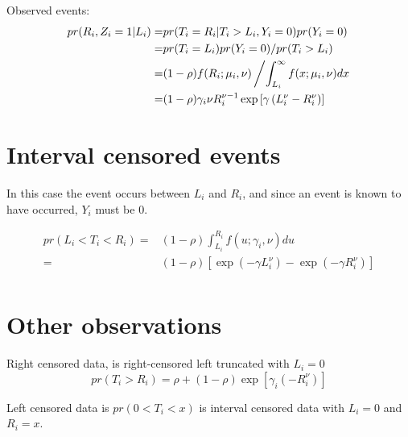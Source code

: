 \documentclass{article}
\begin{document}
Observed events:
\begin{align*}
pr(R_i, Z_i=1 | L_i) =& pr(T_i = R_i | T_i > L_i, Y_i =0)  pr(Y_i = 0) 
\\
=& 
 pr(T_i = L_i) pr(Y_i = 0) /pr(T_i > L_i) \\
=&
 (1-\rho) f(R_i ; \mu_i, \nu) \left/ \int_{L_i}^\infty f(x;\mu_i, \nu) dx  \right.\\
=&
 (1-\rho) \gamma_i\nu R_i^{\nu-1} \exp\left[\gamma\left(L_i^\nu-R_i^\nu\right)\right]
\end{align*}

\section{Interval censored events}

In this case the event occurs between $L_i$ and $R_i$, and since an event is known to have occurred, $Y_i$ must be 0.   

\begin{align*}
pr(L_i < T_i < R_i ) =& (1-\rho) \int_{L_i}^{R_i}f(u;\gamma_i, \nu) du 
\\
=& (1-\rho) \left[ \exp(-\gamma L_i^\nu) -  \exp(-\gamma R_i^\nu)\right]
\\
\end{align*}


\section{Other observations}

Right censored data, is right-censored left truncated with $L_i= 0$
\[
pr(T_i> R_i) = \rho + (1-\rho) \exp\left[\gamma_i\left( -R_i^\nu\right)\right]
\]

Left censored data is $pr(0<T_i < x)$ is interval censored data with $L_i=0$ and $R_i=x$.
\end{document}
